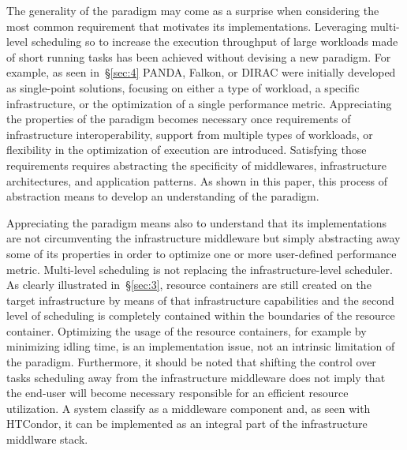 \documentclass{sig-alternate}
\begin{document}
The generality of the \pilot paradigm may come as a surprise when
considering the most common requirement that motivates its
implementations. Leveraging multi-level scheduling so to increase the
execution throughput of large workloads made of short running tasks has
been achieved without devising a new paradigm. For example, as seen
in~\S\ref{sec:4} PANDA, Falkon, or DIRAC were initially developed as
single-point solutions, focusing on either a type of workload, a
specific infrastructure, or the optimization of a single performance
metric. Appreciating the properties of the \pilot paradigm becomes
necessary once requirements of infrastructure interoperability, support
from multiple types of workloads, or flexibility in the optimization of
execution are introduced. Satisfying those requirements requires
abstracting the specificity of middlewares, infrastructure
architectures, and application patterns. As shown in this paper, this
process of abstraction means to develop an understanding of the \pilot
paradigm.

Appreciating the \pilot paradigm means also to understand that its
implementations are not circumventing the infrastructure middleware but
simply abstracting away some of its properties in order to optimize one
or more user-defined performance metric. Multi-level scheduling is not
replacing the infrastructure-level scheduler. As clearly illustrated
in~\S\ref{sec:3}, resource containers are still created on the target
infrastructure by means of that infrastructure capabilities and the
second level of scheduling is completely contained within the boundaries
of the resource container. Optimizing the usage of the resource
containers, for example by minimizing idling time, is an implementation
issue, not an intrinsic limitation of the \pilot paradigm. Furthermore,
it should be noted that shifting the control over tasks scheduling away
from the infrastructure middleware does not imply that the end-user will
become necessary responsible for an efficient resource utilization. A
\pilot system classify as a middleware component and, as seen with
HTCondor, it can be implemented as an integral part of the
infrastructure middlware stack.

\end{document}
